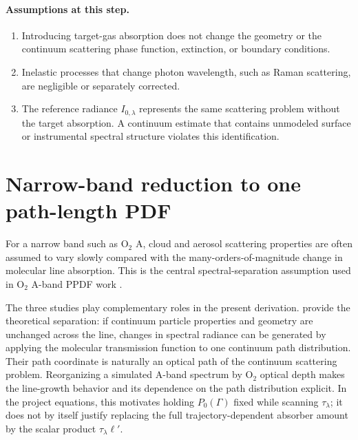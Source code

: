 \documentclass[11pt]{article}
\newcommand{\lp}{\ell'}
\begin{document}
\paragraph{Assumptions at this step.}
\begin{enumerate}
  \item Introducing target-gas absorption does not change the geometry or the
        continuum scattering phase function, extinction, or boundary
        conditions.
  \item Inelastic processes that change photon wavelength, such as Raman
        scattering, are negligible or separately corrected.
  \item The reference radiance $I_{0,\lambda}$ represents the same scattering
        problem without the target absorption.  A continuum estimate that
        contains unmodeled surface or instrumental spectral structure violates
        this identification.
\end{enumerate}

\section{Narrow-band reduction to one path-length PDF}

For a narrow band such as O$_2$ A, cloud and aerosol scattering properties are
often assumed to vary slowly compared with the many-orders-of-magnitude change
in molecular line absorption.  This is the central spectral-separation
assumption used in O$_2$ A-band PPDF work
\citep{stephens2000,min2004,scholl2006}.

The three studies play complementary roles in the present derivation.
\citet{stephens2000} provide the theoretical separation: if continuum particle
properties and geometry are unchanged across the line, changes in spectral
radiance can be generated by applying the molecular transmission function to
one continuum path distribution.  Their path coordinate is naturally an
optical path of the continuum scattering problem.  Reorganizing a simulated
A-band spectrum by O$_2$ optical depth makes the line-growth behavior and its
dependence on the path distribution explicit.  In the project equations, this
motivates holding $P_0(\Gamma)$ fixed while scanning $\tau_\lambda$; it does not
by itself justify replacing the full trajectory-dependent absorber amount by
the scalar product $\tau_\lambda\lp$.
\end{document}
